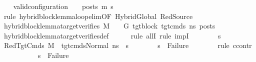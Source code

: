 \begin{isabellebody}
\ \ \isamarkupfalse%
\ {\isachardoublequoteopen}valid{\isacharunderscore}{\kern0pt}configuration\ {\isasymLambda}\ {\isasymGamma}\ {\isasymOmega}\ posts\ m{\isacharprime}{\kern0pt}\ s{\isacharprime}{\kern0pt}{\isachardoublequoteclose}\isanewline
\ \ \isamarkupfalse%
\ {\isacharparenleft}{\kern0pt}rule\ hybrid{\isacharunderscore}{\kern0pt}block{\isacharunderscore}{\kern0pt}lemma{\isacharunderscore}{\kern0pt}loop{\isacharunderscore}{\kern0pt}elim{\isacharbrackleft}{\kern0pt}OF\ HybridGlobal\ RedSource{\isacharbrackright}{\kern0pt}{\isacharparenright}{\kern0pt}\ \ \isanewline
\ \ \ \ \isamarkupfalse%
\ {\isachardoublequoteopen}hybrid{\isacharunderscore}{\kern0pt}block{\isacharunderscore}{\kern0pt}lemma{\isacharunderscore}{\kern0pt}target{\isacharunderscore}{\kern0pt}verifies\ M\ {\isasymLambda}\ {\isasymGamma}\ {\isasymOmega}\ G{\isacharprime}{\kern0pt}\ tgt{\isacharunderscore}{\kern0pt}block\ tgt{\isacharunderscore}{\kern0pt}cmds\ ns\ posts{\isachardoublequoteclose}\isanewline
\ \ \ \ \ \ \isamarkupfalse%
\ hybrid{\isacharunderscore}{\kern0pt}block{\isacharunderscore}{\kern0pt}lemma{\isacharunderscore}{\kern0pt}target{\isacharunderscore}{\kern0pt}verifies{\isacharunderscore}{\kern0pt}def\isanewline
\ \ \ \ \isamarkupfalse%
\ {\isacharparenleft}{\kern0pt}rule\ allI{\isacharcomma}{\kern0pt}\ rule\ impI{\isacharparenright}{\kern0pt}\isanewline
\ \ \ \ \ \ \isamarkupfalse%
\ s{}{\isacharprime}{\kern0pt}\isanewline
\ \ \ \ \ \ \isamarkupfalse%
\ RedTgtCmds{\isacharcolon}{\kern0pt}\ {\isachardoublequoteopen}M{\isacharcomma}{\kern0pt}{\isasymLambda}{\isacharcomma}{\kern0pt}{\isasymGamma}{\isacharcomma}{\kern0pt}{\isasymOmega}\ {\isasymturnstile}\ {\isasymlangle}tgt{\isacharunderscore}{\kern0pt}cmds{\isacharcomma}{\kern0pt}Normal\ ns{\isasymrangle}\ {\isacharbrackleft}{\kern0pt}{\isasymrightarrow}{\isacharbrackright}{\kern0pt}\ s{}{\isacharprime}{\kern0pt}{\isachardoublequoteclose}\isanewline
\isanewline
\ \ \ \ \ \ \isamarkupfalse%
\ {\isachardoublequoteopen}s{}{\isacharprime}{\kern0pt}\ {\isasymnoteq}\ Failure{\isachardoublequoteclose}\isanewline
\ \ \ \ \ \ \isamarkupfalse%
\ {\isacharparenleft}{\kern0pt}rule\ ccontr{\isacharparenright}{\kern0pt}\isanewline
\ \ \ \ \ \ \ \ \isamarkupfalse%
\ {\isachardoublequoteopen}{\isasymnot}\ s{}{\isacharprime}{\kern0pt}\ {\isasymnoteq}\ Failure{\isachardoublequoteclose}\ \isanewline

\end{isabellebody}
